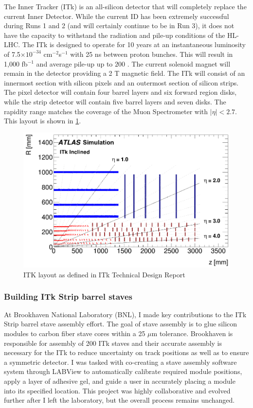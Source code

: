 
The Inner Tracker (ITk) is an all-silicon detector that will completely replace the current Inner Detector.  While the current ID has been extremely successful during Runs 1 and 2 (and will certainly continue to be in Run 3), it does not have the capacity to withstand the radiation and pile-up conditions of the HL-LHC. The ITk is designed to operate for 10 years at an instantaneous luminosity of 7.5$\times10^{-34}$ cm$^{-2}$s$^{-1}$ with 25 ns between proton bunches. This will result in 1,000 fb$^{-1}$ and average pile-up up to $200$ \cite{ITktech}. The current solenoid magnet will remain in the detector providing a 2 T magnetic field. The ITk will consist of an innermost section with silicon pixels and an outermost section of silicon strips. The pixel detector will contain four barrel layers and six forward region disks, while the strip detector will contain five barrel layers and seven disks. The rapidity range matches the coverage of the Muon Spectrometer with $|\eta|<2.7$. This layout is shown in \ref{fig:ITklayout}. 
\begin{figure}[!h]
        \centering
    \includegraphics[width=.6\textwidth]{Pictures/ITklayout.png}
    \caption{ ITK layout as defined in ITk Technical Design Report \cite{ITktech}}
    \label{fig:ITklayout}
\end{figure}

\subsubsection{Building ITk Strip barrel staves}
At Brookhaven National Laboratory (BNL), I made key contributions to the ITk Strip barrel stave assembly effort. The goal of stave assembly is to glue silicon modules to carbon fiber stave cores within a 25 $\mu$m tolerance. Brookhaven is responsible for assembly of 200 ITk staves and their accurate assembly is necessary for the ITk to reduce uncertainty on track positions as well as to ensure a symmetric detector. I was tasked with co-creating a stave assembly software system through LABView to automatically calibrate required module positions, apply a layer of adhesive gel, and guide a user in accurately placing a module into its specified location. This project was highly collaborative and evolved further after I left the laboratory, but the overall process remains unchanged.

